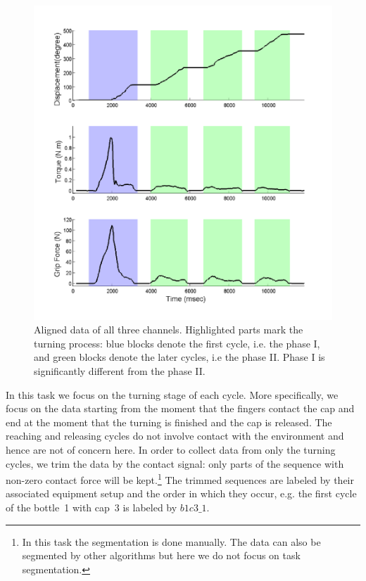 \begin{figure}
  \centering
  \hspace{-1cm}
  \includegraphics[width=14cm]{./fig_cha4/b3c2_1_sTF.pdf}
  \vspace{-0.5cm}
  \caption{ \scriptsize{Aligned data of all three channels. Highlighted parts mark the turning process: blue blocks denote the first cycle, i.e. the phase I, and green blocks denote the later cycles, i.e the phase II. Phase I is significantly different from the phase II.}
}
\label{fig:3channels}
\end{figure}

In this task we focus on the turning stage of each cycle. More specifically, we focus on the data starting from the moment that the fingers contact the cap and end at the moment that the turning is finished and the cap is released. The reaching and releasing cycles do not involve contact with the environment and hence are not of concern here.
In order to collect data from only the turning cycles, we trim the data by the contact signal: only parts of the sequence with non-zero contact force will be kept.\footnote{In this task the segmentation is done manually. The data can also be segmented by other algorithms but here we do not focus on task segmentation.} The trimmed sequences are labeled by their associated equipment setup and the order in which they occur, e.g. the first cycle of the bottle~1 with cap~3 is labeled by $b1c3\_1$.

